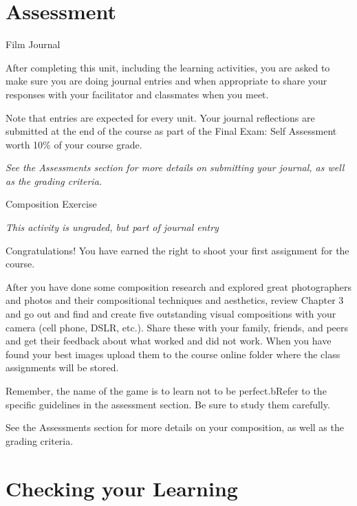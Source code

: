 \documentclass[
]{book}
\begin{document}
\hypertarget{assessment-4}{%
\section*{Assessment}\label{assessment-4}}

\begin{assessment}
{Film Journal}

After completing this unit, including the learning activities, you are asked to make sure you are doing journal entries and when appropriate to share your responses with your facilitator and classmates when you meet.

Note that entries are expected for every unit. Your journal reflections are submitted at the end of the course as part of the Final Exam: Self Assessment worth 10\% of your course grade.

\emph{See the Assessments section for more details on submitting your journal, as well as the grading criteria.}

{Composition Exercise}

\emph{This activity is ungraded, but part of journal entry}

Congratulations! You have earned the right to shoot your first assignment for the course.

After you have done some composition research and explored great photographers and photos and their compositional techniques and aesthetics, review Chapter 3 and go out and find and create five outstanding visual compositions with your camera (cell phone, DSLR, etc.). Share these with your family, friends, and peers and get their feedback about what worked and did not work. When you have found your best images upload them to the course online folder where the class assignments will be stored.

Remember, the name of the game is to learn not to be perfect.bRefer to the specific guidelines in the assessment section. Be sure to study them carefully.

See the Assessments section for more details on your composition, as well as the grading criteria.
\end{assessment}

\hypertarget{checking-your-learning-2}{%
\section*{Checking your Learning}\label{checking-your-learning-2}}
\end{document}
